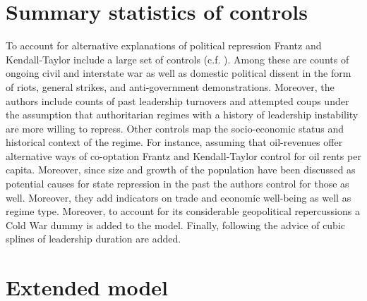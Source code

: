 \documentclass[parskip=half]{scrartcl}\usepackage[]{graphicx}\usepackage[]{color}
\begin{document}
\appendix
\section{Summary statistics of controls}


To account for alternative explanations of political 
repression Frantz and Kendall-Taylor include a large set
of controls (c.f. \cite[338f.]{Frantz.2014}). Among these 
are counts of ongoing civil and interstate war as well as 
domestic political dissent in the form of riots, general 
strikes, and anti-government demonstrations. Moreover, the 
authors include counts of past leadership turnovers and 
attempted coups under the assumption that authoritarian 
regimes with a history of leadership instability are more 
willing to repress. Other controls map the socio-economic 
status and historical context of the regime. For instance, 
assuming that oil-revenues offer alternative ways of 
co-optation Frantz and Kendall-Taylor control for oil rents 
per capita. Moreover, since size and growth of the 
population have been discussed as potential causes for state
repression in the past the authors control for those as 
well. Moreover, they add indicators on trade and economic 
well-being as well as regime type. Moreover, to account for 
its considerable geopolitical repercussions a Cold War dummy
is added to the model. Finally, following the advice of 
\citet{Carter.2010} cubic splines of leadership duration are
added.


\section{Extended model}

\end{document}
